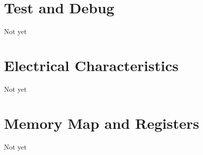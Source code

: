\chapter{Test and Debug}
Not yet

\chapter{Electrical Characteristics}
Not yet

\chapter{Memory Map and Registers}
Not yet


